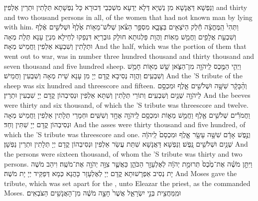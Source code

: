 {וְנַפְשָׁא דַּאֲנָשָׁא מִן נְשַׁיָּא דְּלָא יְדַעָא מִשְׁכְּבֵי דְּכוּרָא כָּל נַפְשָׁתָא תְּלָתִין וּתְרֵין אַלְפִין׃}
{and thirty and two thousand persons in all, of the women that had not known man by lying with him.}{}
{וַתְּהִי֙ הַֽמֶּחֱצָ֔ה חֵ֕לֶק הַיֹּצְאִ֖ים בַּצָּבָ֑א מִסְפַּ֣ר הַצֹּ֗אן שְׁלֹשׁ־מֵא֥וֹת אֶ֙לֶף֙ וּשְׁלֹשִׁ֣ים אֶ֔לֶף וְשִׁבְעַ֥ת אֲלָפִ֖ים וַחֲמֵ֥שׁ מֵאֽוֹת׃}
{וַהֲוָת פַּלְגוּתָא חוּלָק גּוּבְרַיָּא דִּנְפַקוּ לְחֵילָא מִנְיַן עָנָא תְּלָת מְאָה וּתְלָתִין וְשִׁבְעָא אַלְפִין וַחֲמֵישׁ מְאָה׃}
{And the half, which was the portion of them that went out to war, was in number three hundred thousand and thirty thousand and seven thousand and five hundred sheep.}{}
{וַיְהִ֛י הַמֶּ֥כֶס לַֽיהֹוָ֖ה מִן־הַצֹּ֑אן שֵׁ֥שׁ מֵא֖וֹת חָמֵ֥שׁ וְשִׁבְעִֽים׃}
{וַהֲוָה נְסִיבָא קֳדָם יְיָ מִן עָנָא שֵׁית מְאָה וְשִׁבְעִין וַחֲמֵישׁ׃}
{And the \lord’S tribute of the sheep was six hundred and threescore and fifteen.}{}
{וְהַ֨בָּקָ֔ר שִׁשָּׁ֥ה וּשְׁלֹשִׁ֖ים אָ֑לֶף וּמִכְסָ֥ם לַיהֹוָ֖ה שְׁנַ֥יִם וְשִׁבְעִֽים׃}
{וְתוֹרֵי תְּלָתִין וְשִׁתָּא אַלְפִין וּנְסִיבְהוֹן קֳדָם יְיָ שִׁבְעִין וּתְרֵין׃}
{And the beeves were thirty and six thousand, of which the \lord’S tribute was threescore and twelve.}{}
{וַחֲמֹרִ֕ים שְׁלֹשִׁ֥ים אֶ֖לֶף וַחֲמֵ֣שׁ מֵא֑וֹת וּמִכְסָ֥ם לַֽיהֹוָ֖ה אֶחָ֥ד וְשִׁשִּֽׁים׃}
{וּחְמָרֵי תְּלָתִין אַלְפִין וַחֲמֵישׁ מְאָה וּנְסִיבְהוֹן קֳדָם יְיָ שִׁתִּין וְחַד׃}
{And the asses were thirty thousand and five hundred, of which the \lord’S tribute was threescore and one.}{}
{וְנֶ֣פֶשׁ אָדָ֔ם שִׁשָּׁ֥ה עָשָׂ֖ר אָ֑לֶף וּמִכְסָם֙ לַֽיהֹוָ֔ה שְׁנַ֥יִם וּשְׁלֹשִׁ֖ים נָֽפֶשׁ׃}
{וְנַפְשָׁא דַּאֲנָשָׁא שִׁתַּת עֲשַׂר אַלְפִין וּנְסִיבְהוֹן קֳדָם יְיָ תְּלָתִין וּתְרֵין נַפְשָׁן׃}
{And the persons were sixteen thousand, of whom the \lord’S tribute was thirty and two persons.}{}
{וַיִּתֵּ֣ן מֹשֶׁ֗ה אֶת־מֶ֙כֶס֙ תְּרוּמַ֣ת יְהֹוָ֔ה לְאֶלְעָזָ֖ר הַכֹּהֵ֑ן כַּאֲשֶׁ֛ר צִוָּ֥ה יְהֹוָ֖ה אֶת־מֹשֶֽׁה׃}
{וִיהַב מֹשֶׁה יָת נְסִיב אַפְרָשׁוּתָא קֳדָם יְיָ לְאֶלְעָזָר כָּהֲנָא כְּמָא דְּפַקֵּיד יְיָ יָת מֹשֶׁה׃}
{And Moses gave the tribute, which was set apart for the \lord, unto Eleazar the priest, as the \lord\space commanded Moses.}{}
{וּמִֽמַּחֲצִ֖ית בְּנֵ֣י יִשְׂרָאֵ֑ל אֲשֶׁר֙ חָצָ֣ה מֹשֶׁ֔ה מִן־הָאֲנָשִׁ֖ים הַצֹּבְאִֽים׃
}
